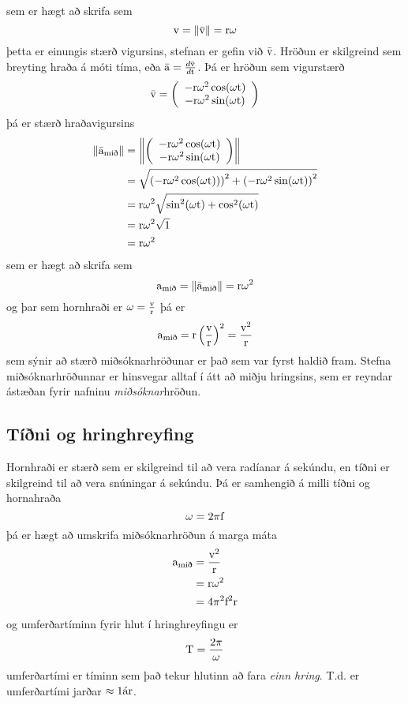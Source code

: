 sem er hægt að skrifa sem
\[
	\uspeed = \left\| \bar \uspeed \right\| = \ulengthr \omega
\]
þetta er einungis stærð vigursins, stefnan er gefin við $\bar \uspeed$. Hröðun
er skilgreind sem breyting hraða á móti tíma, eða $\bar \uaccelea =
\frac{ d \bar \uspeed }{d \utime}$. Þá er hröðun sem vigurstærð
\begin{align*}
	\bar \uspeed = 
		\left( 
			\begin{array}{c}
				- \ulengthr \omega^2 \cos( \omega \utime )\\
				- \ulengthr \omega^2 \sin( \omega \utime)\\
			\end{array}
		\right)
\end{align*}
þá er stærð hraðavigursins 
\begin{align*}
	\left\| \bar \uaccelea_\text{mið} \right\| &= 
		\left\| \left( 
			\begin{array}{c}
				- \ulengthr \omega^2 \cos( \omega \utime )\\
				- \ulengthr \omega^2 \sin( \omega \utime)\\
			\end{array}
		\right)
		\right\| \\
	 &= 
		\sqrt{ \left( - \ulengthr \omega^2 \cos( \omega \utime ) ) \right)^2 
			+ \left( - \ulengthr \omega^2 \sin( \omega \utime) \right)^2 }
		\\
		&= \ulengthr \omega^2 
			\sqrt{ \sin^2( \omega \utime ) +  \cos^2( \omega \utime ) } \\
		&= \ulengthr \omega^2 
			\sqrt{ 1 } \\
		&= \ulengthr \omega^2
\end{align*}
sem er hægt að skrifa sem
\[
	\uaccelea_\text{mið} = \left\| \bar \uaccelea_\text{mið} \right\| = \ulengthr \omega^2
\]
og þar sem hornhraði er $\omega = \frac{\uspeed}{\ulengthr}$ þá er
\[
	\uaccelea_\text{mið} = \ulengthr \left( \frac{\uspeed}{\ulengthr} \right)^2
		= \frac{\uspeed^2}{\ulengthr}
\]
sem sýnir að stærð miðsóknarhröðunar er það sem var fyrst haldið fram. Stefna
miðsóknarhröðunnar er hinsvegar alltaf í átt að miðju hringsins, sem er reyndar
ástæðan fyrir nafninu \emph{miðsóknar}hröðun.

\subsection{Tíðni og hringhreyfing}
Hornhraði er stærð sem er skilgreind til að vera radíanar á sekúndu, en tíðni er
skilgreind til að vera snúningar á sekúndu. Þá er samhengið á milli tíðni
og hornahraða
\begin{equation}
	\omega = 2 \pi \ufrequency
\end{equation}
þá er hægt að umskrifa miðsóknarhröðun á marga máta
\begin{align*}
	\uaccelea_\text{mið} &= 
		\frac{\uspeed^2}{\ulengthr}\\
	 &= 
		\ulengthr \omega^2\\
	 &=
		4 \pi^2 \ufrequency^2 \ulengthr
\end{align*}
og umferðartíminn fyrir hlut í hringhreyfingu er
\[
	\uorbitaltime = \frac{2\pi}{\omega}
\]
umferðartími er tíminn sem það tekur hlutinn að fara \emph{einn hring}. T.d.
er umferðartími jarðar $\approx 1 \uyear$.

